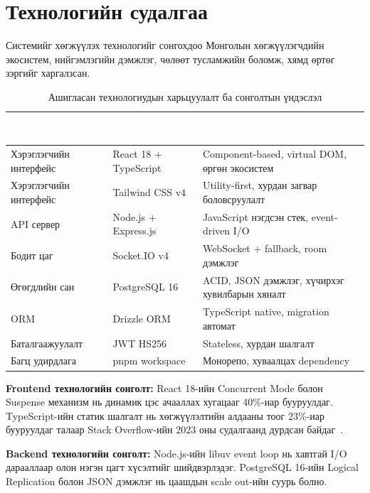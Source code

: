 \section{Технологийн судалгаа}

Системийг хөгжүүлэх технологийг сонгохдоо Монголын хөгжүүлэгчдийн экосистем,
нийгэмлэгийн дэмжлэг, чөлөөт тусламжийн боломж, хямд өртөг зэргийг харгалзсан.

\begin{table}[htbp]
\caption{Ашигласан технологиудын харьцуулалт ба сонголтын үндэслэл}
\label{tab:tech}
\centering
\small
\begin{tabularx}{\textwidth}{|L|L|Y|}
\hline
{}
\textcolor{white}{\textbf{Давхарга}} &
\textcolor{white}{\textbf{Сонгосон технологи}} &
\textcolor{white}{\textbf{Үндэслэл}} \\ \hline
Хэрэглэгчийн интерфейс & React 18 + TypeScript &
  Component-based, virtual DOM, өргөн экосистем \\ \hline
{}
Хэрэглэгчийн интерфейс & Tailwind CSS v4 &
  Utility-first, хурдан загвар боловсруулалт \\ \hline
API сервер & Node.js + Express.js &
  JavaScript нэгдсэн стек, event-driven I/O \\ \hline
{}
Бодит цаг & Socket.IO v4 &
  WebSocket + fallback, room дэмжлэг \\ \hline
Өгөгдлийн сан & PostgreSQL 16 &
  ACID, JSON дэмжлэг, хүчирхэг хувилбарын хяналт \\ \hline
{}
ORM & Drizzle ORM &
  TypeScript native, migration автомат \\ \hline
Баталгаажуулалт & JWT HS256 &
  Stateless, хурдан шалгалт \\ \hline
{}
Багц удирдлага & pnpm workspace &
  Монорепо, хуваалцах dependency \\ \hline
\end{tabularx}
\end{table}

\textbf{Frontend технологийн сонголт:} React 18-ийн Concurrent Mode болон Suspense
механизм нь динамик цэс ачааллах хугацааг 40\%-иар бууруулдаг. TypeScript-ийн статик
шалгалт нь хөгжүүлэлтийн алдааны тоог 23\%-иар бууруулдаг талаар Stack Overflow-ийн
2023 оны судалгаанд дурдсан байдаг~\cite{stackoverflow2023}.

\textbf{Backend технологийн сонголт:} Node.js-ийн libuv event loop нь хавтгай I/O
дарааллаар олон нэгэн цагт хүсэлтийг шийдвэрлэдэг. PostgreSQL 16-ийн Logical
Replication болон JSON дэмжлэг нь цаашдын scale out-ийн суурь болно.

